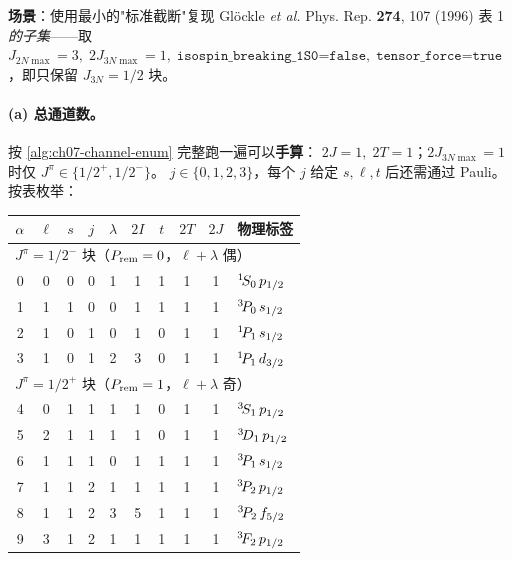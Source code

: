 \begin{numericalbox}[label={box:ch07-numerical-closure}]
\textbf{场景}：使用最小的"标准截断"复现 Glöckle \emph{et al.} Phys. Rep.
\textbf{274}, 107 (1996) 表 1 \emph{的子集}——取
\(J_{2N\max} = 3,\;2J_{3N\max} = 1,\;\texttt{isospin\_breaking\_1S0=false},\;
\texttt{tensor\_force=true}\)，即只保留 \(J_{3N} = 1/2\) 块。

\paragraph{(a) 总通道数。}
按 \cref{alg:ch07-channel-enum} 完整跑一遍可以\textbf{手算}：
\(2J = 1,\; 2T = 1\)；\(2J_{3N\max} = 1\) 时仅
\(J^\pi \in \{1/2^+, 1/2^-\}\)。
\(j \in \{0, 1, 2, 3\}\)，每个 \(j\) 给定 \(s, \ell, t\) 后还需通过 Pauli。
按表枚举：

\begin{center}
\begin{tabular}{cccccccccl}
\toprule
\(\alpha\) & \(\ell\) & \(s\) & \(j\) & \(\lambda\) & \(2I\) & \(t\) & \(2T\) & \(2J\) & 物理标签 \\
\midrule
\multicolumn{10}{l}{\textbf{\(J^\pi = 1/2^-\)} 块（\(P_{\rm rem} = 0\)，\(\ell + \lambda\) 偶）} \\
0 & 0 & 0 & 0 & 1 & 1 & 1 & 1 & 1 & \({}^{1}\!S_{0}\, p_{1/2}\) \\
1 & 1 & 1 & 0 & 0 & 1 & 1 & 1 & 1 & \({}^{3}\!P_{0}\, s_{1/2}\) \\
2 & 1 & 0 & 1 & 0 & 1 & 0 & 1 & 1 & \({}^{1}\!P_{1}\, s_{1/2}\) \\
3 & 1 & 0 & 1 & 2 & 3 & 0 & 1 & 1 & \({}^{1}\!P_{1}\, d_{3/2}\) \\
\midrule
\multicolumn{10}{l}{\textbf{\(J^\pi = 1/2^+\)} 块（\(P_{\rm rem} = 1\)，\(\ell + \lambda\) 奇）} \\
4 & 0 & 1 & 1 & 1 & 1 & 0 & 1 & 1 & \({}^{3}\!S_{1}\, p_{1/2}\) \\
5 & 2 & 1 & 1 & 1 & 1 & 0 & 1 & 1 & \({}^{3}\!D_{1}\, p_{1/2}\) \\
6 & 1 & 1 & 1 & 0 & 1 & 1 & 1 & 1 & \({}^{3}\!P_{1}\, s_{1/2}\) \\
7 & 1 & 1 & 2 & 1 & 1 & 1 & 1 & 1 & \({}^{3}\!P_{2}\, p_{1/2}\) \\
8 & 1 & 1 & 2 & 3 & 5 & 1 & 1 & 1 & \({}^{3}\!P_{2}\, f_{5/2}\) \\
9 & 3 & 1 & 2 & 1 & 1 & 1 & 1 & 1 & \({}^{3}\!F_{2}\, p_{1/2}\) \\
\bottomrule
\end{tabular}
\end{center}


\end{numericalbox}
